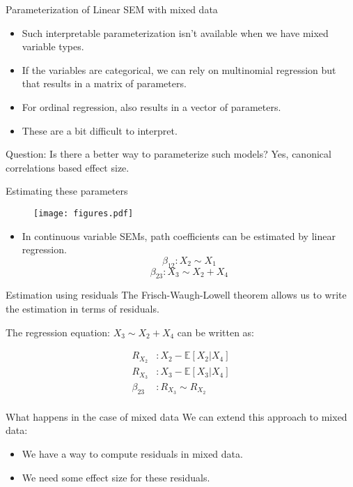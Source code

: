 \documentclass{beamer}
\begin{document}
\begin{frame}{Parameterization of Linear SEM with mixed data}
	\begin{itemize}
		\item Such interpretable parameterization isn't available when we have mixed variable types.
		\item If the variables are categorical, we can rely on multinomial regression but that results
			in a matrix of parameters.
		\item For ordinal regression, also results in a vector of parameters.
		\item These are a bit difficult to interpret.
	\end{itemize}

	Question: Is there a better way to parameterize such models? Yes, canonical correlations based effect size.
\end{frame}

\begin{frame}{Estimating these parameters}
	\begin{figure}
		\centering
		\texttt{[image: figures.pdf]}
	\end{figure}
	\begin{itemize}
		\item In continuous variable SEMs, path coefficients can be estimated by linear regression.
			$$ \beta_{12}: X_2 \sim X_1 $$
			$$ \beta_{23}: X_3 \sim X_2 + X_4 $$
	\end{itemize}
\end{frame}

\begin{frame}{Estimation using residuals}
	The Frisch-Waugh-Lowell theorem allows us to write the estimation in
	terms of residuals. 

	The regression equation: $ X_3 \sim X_2 + X_4 $ can
	be written as:

	\begin{equation*}
		\begin{split}
			R_{X_2}&: X_2 - \mathbb{E}[X_2 | X_4] \\
			R_{X_3}&: X_3 - \mathbb{E}[X_3 | X_4] \\
			\beta_{23}&: R_{X_3} \sim R_{X_2} \\
		\end{split}
	\end{equation*}
\end{frame}

\begin{frame}{What happens in the case of mixed data}
	We can extend this approach to mixed data:
	\begin{itemize}
		\item We have a way to compute residuals in mixed data.
		\item We need some effect size for these residuals.
	\end{itemize}
\end{frame}
\end{document}
